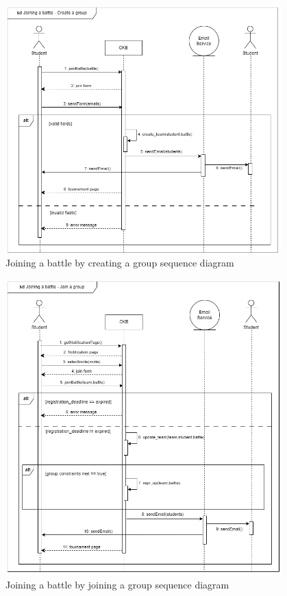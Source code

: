 \begin{figure}[H]
    \centering
    \includegraphics[width=0.95\textwidth]{images/seq_diagrams/joining_battle-create_group.png}
    \caption{Joining a battle by creating a group sequence diagram}
    \label{fig:sequence_diagram}
\end{figure}
\clearpage

\begin{figure}[H]
    \centering
    \includegraphics[width=0.95\textwidth]{images/seq_diagrams/joining_battle-join_group.png}
    \caption{Joining a battle by joining a group sequence diagram}
    \label{fig:sequence_diagram}
\end{figure}
\clearpage

